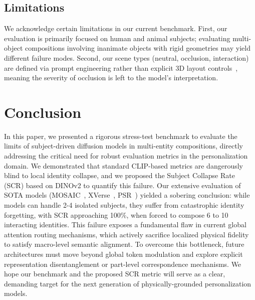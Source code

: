 \subsection{Limitations}
We acknowledge certain limitations in our current benchmark. First, our evaluation is primarily focused on human and animal subjects; evaluating multi-object compositions involving inanimate objects with rigid geometries may yield different failure modes. Second, our scene types (neutral, occlusion, interaction) are defined via prompt engineering rather than explicit 3D layout controls~\cite{contextgen2024,anyms2024}, meaning the severity of occlusion is left to the model's interpretation.

\section{Conclusion}

In this paper, we presented a rigorous stress-test benchmark to evaluate the limits of subject-driven diffusion models in multi-entity compositions, directly addressing the critical need for robust evaluation metrics in the personalization domain. We demonstrated that standard CLIP-based metrics are dangerously blind to local identity collapse, and we proposed the Subject Collapse Rate (SCR) based on DINOv2 to quantify this failure. Our extensive evaluation of SOTA models (MOSAIC~\cite{mosaic2024}, XVerse~\cite{xverse2024}, PSR~\cite{psr2024}) yielded a sobering conclusion: while models can handle 2-4 isolated subjects, they suffer from catastrophic identity forgetting, with SCR approaching 100\%, when forced to compose 6 to 10 interacting identities. This failure exposes a fundamental flaw in current global attention routing mechanisms, which actively sacrifice localized physical fidelity to satisfy macro-level semantic alignment. To overcome this bottleneck, future architectures must move beyond global token modulation and explore explicit representation disentanglement or part-level correspondence mechanisms. We hope our benchmark and the proposed SCR metric will serve as a clear, demanding target for the next generation of physically-grounded personalization models.

